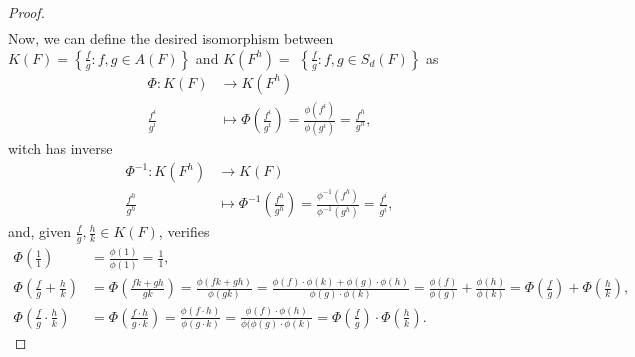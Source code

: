 \documentclass[11pt,a4paper]{article}
\begin{document}
\begin{proof}
\begin{align*}
  \end{align*}
  Now, we can define the desired isomorphism between $ K(F) = \left\{\frac{f}{g}: f, g \in A(F)\right\} $ and $ K(F^h) = $ $ \left\{\frac{f}{g}: f, g \in S_d(F)\right\} $ as
  \begin{align*}
    \Phi: K(F) &\longrightarrow K(F^h) \\
    \frac{f^i}{g^i} &\longmapsto \Phi \left(\frac{f^i}{g^i}\right)= \frac{\phi(f^i)}{\phi(g^i)} = \frac{f^h}{g^h},
  \end{align*}
  witch has inverse
  \begin{align*}
    \Phi^{-1}: K(F^h) &\longrightarrow K(F) \\
    \frac{f^h}{g^h} &\longmapsto \Phi^{-1} \left(\frac{f^h}{g^h}\right)= \frac{\phi^{-1}(f^h)}{\phi^{-1}(g^h)} = \frac{f^i}{g^i},
  \end{align*}
  and, given $ \frac{f}{g}, \frac{h}{k} \in K(F) $, verifies
  \begin{align*}
    \Phi(\frac{1}{1}) &= \frac{\phi(1)}{\phi(1)} = \frac{1}{1}, \\
    \Phi(\frac{f}{g} + \frac{h}{k}) &= \Phi(\frac{fk + gh}{gk}) = \frac{\phi(fk + gh)}{\phi(gk)} = \frac{\phi(f) \cdot \phi(k) + \phi(g) \cdot\phi(h)}{\phi(g) \cdot \phi(k)} = \frac{\phi(f)}{\phi(g)} + \frac{\phi(h)}{\phi(k)} = \Phi(\frac{f}{g}) + \Phi(\frac{h}{k}), \\
    \Phi(\frac{f}{g} \cdot \frac{h}{k}) &= \Phi(\frac{f\cdot h}{g \cdot k}) = \frac{\phi(f\cdot h)}{\phi(g \cdot k)} = \frac{\phi(f) \cdot \phi(h)}{\phi(\phi(g) \cdot \phi(k)} = \Phi(\frac{f}{g})\cdot \Phi(\frac{h}{k}).
  \end{align*}
\end{proof}
\end{document}

